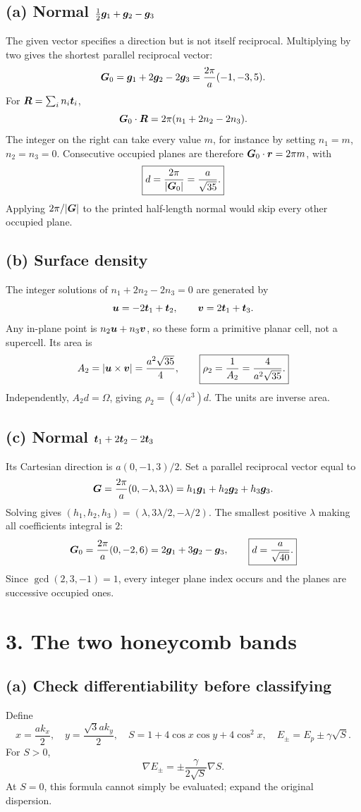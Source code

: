 \subsection*{(a) Normal $\tfrac12\boldsymbol{g}_1+\boldsymbol{g}_2-\boldsymbol{g}_3$}
The given vector specifies a direction but is not itself reciprocal. Multiplying by two gives the shortest parallel reciprocal vector:
\[
\boldsymbol{G}_0=\boldsymbol{g}_1+2\boldsymbol{g}_2-2\boldsymbol{g}_3
=\frac{2\pi}{a}(-1,-3,5).
\]
For $\boldsymbol{R}=\sum_i n_i\boldsymbol{t}_i$,
\[
\boldsymbol{G}_0\cdot\boldsymbol{R}=2\pi(n_1+2n_2-2n_3).
\]
The integer on the right can take every value $m$, for instance by setting $n_1=m$, $n_2=n_3=0$. Consecutive occupied planes are therefore $\boldsymbol{G}_0\cdot\boldsymbol{r}=2\pi m$, with
\[
\boxed{d=\frac{2\pi}{|\boldsymbol{G}_0|}=\frac a{\sqrt{35}}.}
\]
Applying $2\pi/|\boldsymbol{G}|$ to the printed half-length normal would skip every other occupied plane.

\subsection*{(b) Surface density}
The integer solutions of $n_1+2n_2-2n_3=0$ are generated by
\[
\boldsymbol{u}=-2\boldsymbol{t}_1+\boldsymbol{t}_2,\qquad
\boldsymbol{v}=2\boldsymbol{t}_1+\boldsymbol{t}_3.
\]
Any in-plane point is $n_2\boldsymbol{u}+n_3\boldsymbol{v}$, so these form a primitive planar cell, not a supercell. Its area is
\[
A_2=|\boldsymbol{u}\times\boldsymbol{v}|=\frac{a^2\sqrt{35}}4,\qquad
\boxed{\rho_2=\frac1{A_2}=\frac4{a^2\sqrt{35}}.}
\]
Independently, $A_2d=\Omega$, giving $\rho_2=(4/a^3)d$. The units are inverse area.

\subsection*{(c) Normal $\boldsymbol{t}_1+2\boldsymbol{t}_2-2\boldsymbol{t}_3$}
Its Cartesian direction is $a(0,-1,3)/2$. Set a parallel reciprocal vector equal to
\[
\boldsymbol{G}=\frac{2\pi}{a}(0,-\lambda,3\lambda)
=h_1\boldsymbol{g}_1+h_2\boldsymbol{g}_2+h_3\boldsymbol{g}_3.
\]
Solving gives $(h_1,h_2,h_3)=(\lambda,3\lambda/2,-\lambda/2)$. The smallest positive $\lambda$ making all coefficients integral is $2$:
\[
\boldsymbol{G}_0=\frac{2\pi}{a}(0,-2,6)=2\boldsymbol{g}_1+3\boldsymbol{g}_2-\boldsymbol{g}_3,
\qquad \boxed{d=\frac a{\sqrt{40}}.}
\]
Since $\gcd(2,3,-1)=1$, every integer plane index occurs and the planes are successive occupied ones.

\section*{3. The two honeycomb bands}
\subsection*{(a) Check differentiability before classifying}
Define
\[
x=\frac{ak_x}{2},\quad y=\frac{\sqrt3ak_y}{2},\quad
S=1+4\cos x\cos y+4\cos^2x,\quad E_\pm=E_p\pm\gamma\sqrt S.
\]
For $S>0$,
\[
\nabla E_\pm=\pm\frac{\gamma}{2\sqrt S}\nabla S.
\]
At $S=0$, this formula cannot simply be evaluated; expand the original dispersion.

